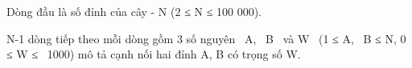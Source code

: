 Dòng đầu là số đỉnh của cây - N (2 ≤ N ≤ 100 000).

N-1 dòng tiếp theo mỗi dòng gồm 3 số nguyên  A,  B  và W  (1 ≤ A,  B ≤ N, 0 ≤ W ≤  1000) mô tả cạnh nối hai đỉnh A, B có trọng số W.

\